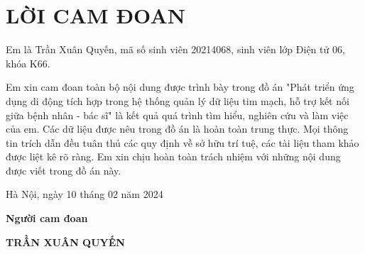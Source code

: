 \section*{LỜI CAM ĐOAN} %
\thispagestyle{empty}

Em là Trần Xuân Quyến, mã số sinh viên 20214068, sinh viên lớp Điện tử 06, khóa K66.

Em xin cam đoan toàn bộ nội dung được trình bày trong đồ án "Phát triển ứng dụng di động tích hợp trong hệ thống quản lý dữ liệu tim mạch, hỗ trợ kết nối giữa bệnh nhân - bác sĩ" 
là kết quả quá trình tìm hiểu, nghiên cứu và làm việc của em. Các dữ liệu được nêu trong đồ án là hoàn toàn trung thực. 
Mọi thông tin trích dẫn đều tuân thủ các quy định về sở hữu trí tuệ, các tài liệu tham khảo được liệt kê rõ ràng. 
Em xin chịu hoàn toàn trách nhiệm với những nội dung được viết trong đồ án này.


\vspace{6pt}

\hspace{8cm}Hà Nội, ngày 10 tháng 02 năm 2024

\hspace{9cm}\textbf{Người cam đoan}

\vspace{2cm}
\hspace{8.5cm}\textbf{TRẦN XUÂN QUYẾN}

\cleardoublepage
